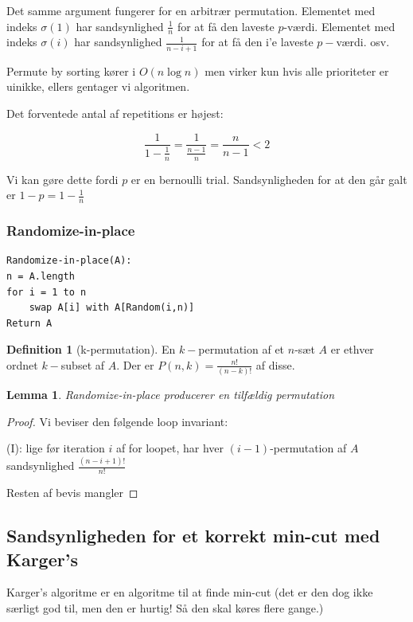 \documentclass[11pt]{article}
\newtheorem{lemma}[theorem]{Lemma}
\theoremstyle{definition}
\newtheorem{definition}{Definition}
\theoremstyle{remark}
\begin{document}
Det samme argument fungerer for en arbitrær permutation. Elementet med indeks $\sigma(1)$ har sandsynlighed $\frac{1}{n}$ for at få den laveste $p$-værdi. Elementet med indeks $\sigma(i)$ har sandsynlighed $\frac{1}{n-i+1}$ for at få den i'e laveste $p-$værdi. osv.

Permute by sorting kører i $O(n \log n)$ men virker kun hvis alle prioriteter er uinikke, ellers gentager vi algoritmen.

Det forventede antal af repetitions er højest:

\[
\frac{1}{1- \frac{1}{n}} = \frac{1}{\frac{n-1}{n}} = \frac{n}{n-1} < 2
\]

Vi kan gøre dette fordi $p$ er en bernoulli trial. Sandsynligheden for at den går galt er $1 - p = 1 - \frac{1}{n}$


\subsubsection{Randomize-in-place}

\begin{verbatim}
Randomize-in-place(A):
n = A.length
for i = 1 to n
    swap A[i] with A[Random(i,n)]
Return A
\end{verbatim}

\begin{definition}[k-permutation]
  En $k-$permutation af et $n$-sæt $A$ er ethver ordnet $k-$subset af $A$.
  Der er  $P(n,k) = \frac{n!}{(n-k)!}$ af disse.
\end{definition}

\begin{lemma}
Randomize-in-place producerer en tilfældig permutation
\end{lemma}

\begin{proof}
  Vi beviser den følgende loop invariant:

  (I): lige før iteration $i$ af for loopet, har hver $(i-1)$-permutation af $A$ sandsynlighed $\frac{(n-i+1)!}{n!}$ 

  Resten af bevis mangler
\end{proof}


\subsection{Sandsynligheden for et korrekt min-cut med Karger's}
\label{subsec:label}


Karger's algoritme er en algoritme til at finde min-cut (det er den dog ikke særligt god til, men den er hurtig! Så den skal køres flere gange.)
\end{document}
